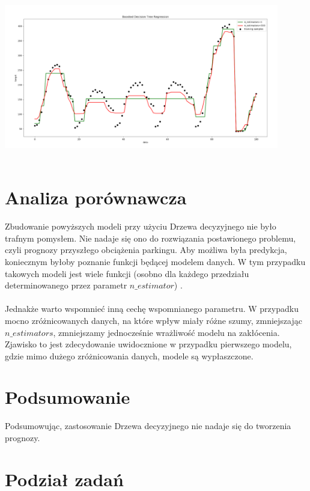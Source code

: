 \documentclass[]{article}
\begin{document}
\\
\includegraphics[width=12cm]{image-1}\\
\\
\section{Analiza porównawcza}
Zbudowanie powyższych modeli przy użyciu Drzewa decyzyjnego nie było trafnym pomysłem. Nie nadaje się ono do rozwiązania postawionego problemu, czyli prognozy przyszłego obciążenia parkingu. Aby możliwa była predykcja, koniecznym byłoby poznanie funkcji będącej modelem danych. W tym przypadku takowych modeli jest wiele funkcji (osobno dla każdego przedziału determinowanego przez parametr $n\_estimator$) .\\
\\
Jednakże warto wspomnieć inną cechę wspomnianego parametru. W przypadku mocno zróżnicowanych danych, na które wpływ miały różne szumy, zmniejszając $n\_estimators$, zmniejszamy jednocześnie wrażliwość modelu na zakłócenia. Zjawisko to jest zdecydowanie uwidocznione w przypadku pierwszego modelu, gdzie mimo dużego zróżnicowania danych, modele są wypłaszczone.

\section{Podsumowanie}
Podsumowując, zastosowanie Drzewa decyzyjnego nie nadaje się do tworzenia prognozy.


\section{Podział zadań}
\end{document}

